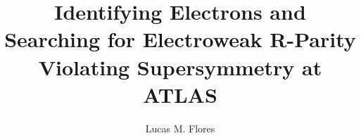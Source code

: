 
\title{Identifying Electrons and Searching for Electroweak R-Parity Violating Supersymmetry at ATLAS}

\author{Lucas M. Flores}

\newcommand{\adviser}{Evelyn Thomson, Professor, Physics and Astronomy}
\newcommand{\advisershort}{E. Thomson}

\newcommand{\myinstitution}{The University of Pennsylvania}

\newcommand{\chairperson}{Ravi Sheth, Professor, Physics and Astronomy}

\newcommand{\committeeOne}{James Aguirre, Associate Professor, Physics and Astronomy}
\newcommand{\committeeTwo}{Jonathan Heckman, Associate Professor, Physics and Astronomy}
\newcommand{\committeeThree}{I. Joseph Kroll, Professor, Physics and Astronomy}
\newcommand{\committeeFour}{Burt Ovrut, Professor, Physics and Astronomy}
\newcommand{\committeeFive}{Evelyn Thomson, Professor, Physics and Astronomy}





